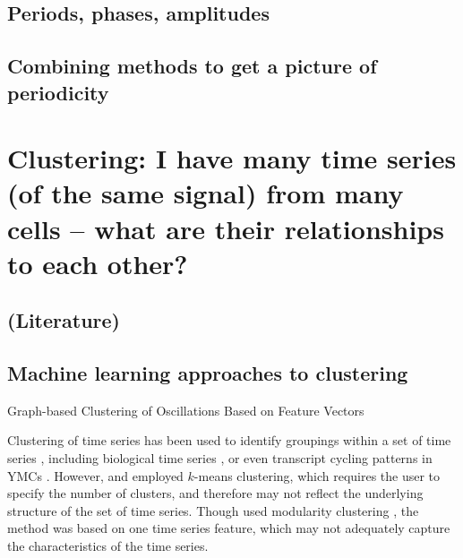 \subsection{Periods, phases, amplitudes}
\label{subsec:analysis-characterisation-quantities}

\subsection{Combining methods to get a picture of periodicity}
\label{subsec:analysis-characterisation-combined}


\section{Clustering: I have many time series (of the same signal) from many cells -- what are their relationships to each other?}
\label{sec:analysis-clustering}

\subsection{(Literature)}
\label{subsec:analysis-clustering-literature}

\subsection{Machine learning approaches to clustering}
\label{subsec:analysis-clustering-ml}

Graph-based Clustering of Oscillations Based on Feature Vectors

Clustering of time series has been used to identify groupings within a set of time series \citep{wangStructureBasedStatisticalFeatures2007}, including biological time series \citep{shafieiDopamineSignalingModulates2019}, or even transcript cycling patterns in YMCs \citep{tuLogicYeastMetabolic2005}.
However, \citet{wangStructureBasedStatisticalFeatures2007} and \citet{tuLogicYeastMetabolic2005} employed $k$-means clustering, which requires the user to specify the number of clusters, and therefore may not reflect the underlying structure of the set of time series.
Though \citet{shafieiDopamineSignalingModulates2019} used modularity clustering \citep{newmanModularityCommunityStructure2006}, the method was based on one time series feature, which may not adequately capture the characteristics of the time series.

